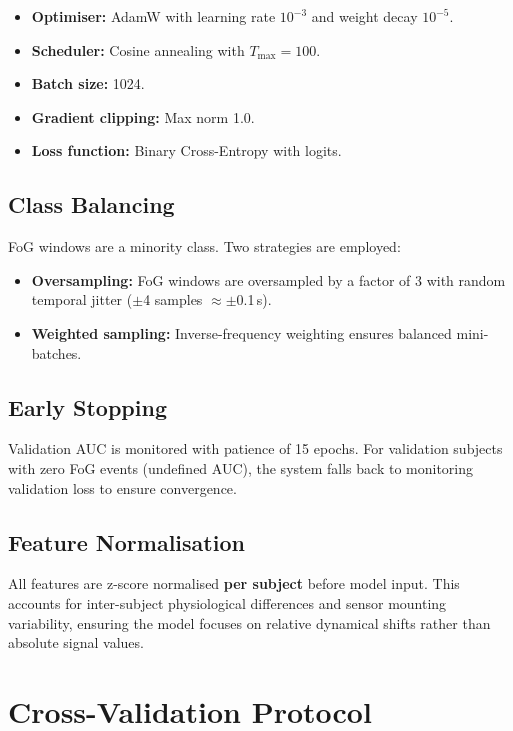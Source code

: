 \documentclass[12pt,a4paper,oneside]{report}
\numberwithin{equation}{chapter}
\numberwithin{figure}{chapter}
\numberwithin{table}{chapter}
\begin{document}
\begin{itemize}[leftmargin=*, itemsep=2pt]
  \item \textbf{Optimiser:} AdamW with learning rate $10^{-3}$ and weight decay $10^{-5}$.
  \item \textbf{Scheduler:} Cosine annealing with $T_{\max} = 100$.
  \item \textbf{Batch size:} 1024.
  \item \textbf{Gradient clipping:} Max norm 1.0.
  \item \textbf{Loss function:} Binary Cross-Entropy with logits.
\end{itemize}

\subsection{Class Balancing}

FoG windows are a minority class. Two strategies are employed:
\begin{itemize}[leftmargin=*, itemsep=2pt]
  \item \textbf{Oversampling:} FoG windows are oversampled by a factor of 3 with random temporal jitter ($\pm$4 samples $\approx \pm$0.1\,s).
  \item \textbf{Weighted sampling:} Inverse-frequency weighting ensures balanced mini-batches.
\end{itemize}

\subsection{Early Stopping}

Validation AUC is monitored with patience of 15 epochs. For validation subjects with zero FoG events (undefined AUC), the system falls back to monitoring validation loss to ensure convergence.

\subsection{Feature Normalisation}

All features are z-score normalised \textbf{per subject} before model input. This accounts for inter-subject physiological differences and sensor mounting variability, ensuring the model focuses on relative dynamical shifts rather than absolute signal values.

\section{Cross-Validation Protocol}
\end{document}
